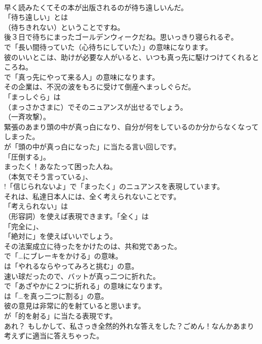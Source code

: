\documentclass[8pt]{extreport}
\begin{document}
\begin{CJK}{UTF8}{min}
\\	早く読みたくてその本が出版されるのが待ち遠しいんだ。 
\\	「待ち遠しい」とは 
\\	（待ちきれない）ということですね。	
\\	後３日で待ちにまったゴールデンウィークだね。思いっきり寝られるぞ。 
\\	で「長い間待っていた（心待ちにしていた）」の意味になります。	
\\	彼のいいとこは、助けが必要な人がいると、いつも真っ先に駆けつけてくれるところね。 
\\	で「真っ先にやって来る人」の意味になります。	
\\	その企業は、不況の波をもろに受けて倒産へまっしぐらだ。 
\\	「まっしぐら」は
\\	（まっさかさまに）でそのニュアンスが出せるでしょう。
\\	（一斉攻撃）。	
\\	緊張のあまり頭の中が真っ白になり、自分が何をしているのか分からなくなってしまった。 
\\	が「頭の中が真っ白になった」に当たる言い回しです。
\\	「圧倒する」。	
\\	まったく！あなたって困った人ね。 
\\	（本気でそう言っている」、
\\	!「信じられないよ」で「まったく」のニュアンスを表現しています。	
\\	それは、私達日本人には、全く考えられないことです。 
\\	「考えられない」は
\\	（形容詞）を使えば表現できます。「全く」は
\\	「完全に」、
\\	「絶対に」を使えばいいでしょう。	
\\	その法案成立に待ったをかけたのは、共和党であった。 
\\	で「…にブレーキをかける」の意味。
\\	は「やれるならやってみろと挑む」の意。	
\\	速い球だったので、バットが真っ二つに折れた。 
\\	で「あざやかに２つに折れる」の意味になります。
\\	は「…を真っ二つに割る」の意。	
\\	彼の意見は非常に的を射ていると思います。 
\\	が「的を射る」に当たる表現です。	
\\	あれ？ もしかして、私さっき全然的外れな答えをした？ごめん！なんかあまり考えずに適当に答えちゃった。 

\end{CJK}
\end{document}
